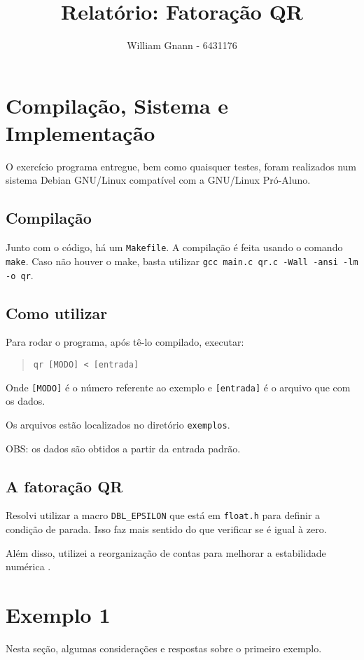 \documentclass[12pt,a4paper]{article}
\author{William Gnann - 6431176}
\title{Relatório: Fatoração QR}
\begin{document}
\maketitle
\section{Compilação, Sistema e Implementação}
O exercício programa entregue, bem como quaisquer testes, foram realizados num 
sistema Debian GNU/Linux compatível com a GNU/Linux Pró-Aluno.

\subsection{Compilação}
Junto com o código, há um \verb+Makefile+. A compilação é feita usando o 
comando \verb+make+. Caso não houver o make, basta utilizar \verb+gcc main.c qr.c -Wall -ansi -lm -o qr+.

\subsection{Como utilizar}
Para rodar o programa, após tê-lo compilado, executar:
\begin{quote}
\begin{verbatim}
qr [MODO] < [entrada]
\end{verbatim}
\end{quote}

Onde \verb+[MODO]+ é o número referente ao exemplo e \verb+[entrada]+ é o arquivo que com os dados.

Os arquivos estão localizados no diretório \verb+exemplos+.

OBS: os dados são obtidos a partir da entrada padrão. 

\subsection{A fatoração QR}
Resolvi utilizar a macro \verb+DBL_EPSILON+ que está em \verb+float.h+ para definir a condição de parada. 
Isso faz mais sentido do que verificar se é igual à zero.

Além disso, utilizei a reorganização de contas para melhorar a estabilidade numérica \cite{GSM}.

\section{Exemplo 1}
Nesta seção, algumas considerações e respostas sobre o primeiro exemplo.
\end{document}
